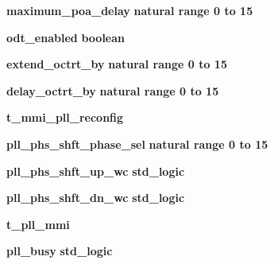 \begin{DoxyCompactItemize}
\item 
{\bf maximum\+\_\+poa\+\_\+delay} {\bfseries {\bfseries \textcolor{comment}{natural}\textcolor{vhdlchar}{ }\textcolor{vhdlchar}{ }\textcolor{vhdlchar}{ }\textcolor{keywordflow}{range}\textcolor{vhdlchar}{ }\textcolor{vhdlchar}{ } \textcolor{vhdldigit}{0} \textcolor{vhdlchar}{ }\textcolor{keywordflow}{to}\textcolor{vhdlchar}{ }\textcolor{vhdlchar}{ } \textcolor{vhdldigit}{15} \textcolor{vhdlchar}{ }}} 
\item 
{\bf odt\+\_\+enabled} {\bfseries {\bfseries \textcolor{comment}{boolean}\textcolor{vhdlchar}{ }}} 
\item 
{\bf extend\+\_\+octrt\+\_\+by} {\bfseries {\bfseries \textcolor{comment}{natural}\textcolor{vhdlchar}{ }\textcolor{vhdlchar}{ }\textcolor{vhdlchar}{ }\textcolor{keywordflow}{range}\textcolor{vhdlchar}{ }\textcolor{vhdlchar}{ } \textcolor{vhdldigit}{0} \textcolor{vhdlchar}{ }\textcolor{keywordflow}{to}\textcolor{vhdlchar}{ }\textcolor{vhdlchar}{ } \textcolor{vhdldigit}{15} \textcolor{vhdlchar}{ }}} 
\item 
{\bf delay\+\_\+octrt\+\_\+by} {\bfseries {\bfseries \textcolor{comment}{natural}\textcolor{vhdlchar}{ }\textcolor{vhdlchar}{ }\textcolor{vhdlchar}{ }\textcolor{keywordflow}{range}\textcolor{vhdlchar}{ }\textcolor{vhdlchar}{ } \textcolor{vhdldigit}{0} \textcolor{vhdlchar}{ }\textcolor{keywordflow}{to}\textcolor{vhdlchar}{ }\textcolor{vhdlchar}{ } \textcolor{vhdldigit}{15} \textcolor{vhdlchar}{ }}} 
\item 
{\bf t\+\_\+mmi\+\_\+pll\+\_\+reconfig} {\bfseries  }
\item 
{\bf pll\+\_\+phs\+\_\+shft\+\_\+phase\+\_\+sel} {\bfseries {\bfseries \textcolor{comment}{natural}\textcolor{vhdlchar}{ }\textcolor{vhdlchar}{ }\textcolor{vhdlchar}{ }\textcolor{keywordflow}{range}\textcolor{vhdlchar}{ }\textcolor{vhdlchar}{ } \textcolor{vhdldigit}{0} \textcolor{vhdlchar}{ }\textcolor{keywordflow}{to}\textcolor{vhdlchar}{ }\textcolor{vhdlchar}{ } \textcolor{vhdldigit}{15} \textcolor{vhdlchar}{ }}} 
\item 
{\bf pll\+\_\+phs\+\_\+shft\+\_\+up\+\_\+wc} {\bfseries {\bfseries \textcolor{comment}{std\+\_\+logic}\textcolor{vhdlchar}{ }}} 
\item 
{\bf pll\+\_\+phs\+\_\+shft\+\_\+dn\+\_\+wc} {\bfseries {\bfseries \textcolor{comment}{std\+\_\+logic}\textcolor{vhdlchar}{ }}} 
\item 
{\bf t\+\_\+pll\+\_\+mmi} {\bfseries  }
\item 
{\bf pll\+\_\+busy} {\bfseries {\bfseries \textcolor{comment}{std\+\_\+logic}\textcolor{vhdlchar}{ }}} 

\end{DoxyCompactItemize}
